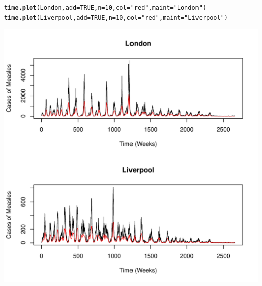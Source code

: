\documentclass[12pt]{article}\usepackage[]{graphicx}\usepackage[]{color}
\makeatletter
\def\maxwidth{ %
  \ifdim\Gin@nat@width>\linewidth
    \linewidth
  \else
    \Gin@nat@width
  \fi
}
\newcommand{\hlnum}[1]{\textcolor[rgb]{0.686,0.059,0.569}{#1}}%
\newcommand{\hlstr}[1]{\textcolor[rgb]{0.192,0.494,0.8}{#1}}%
\newcommand{\hlstd}[1]{\textcolor[rgb]{0.345,0.345,0.345}{#1}}%
\newcommand{\hlkwc}[1]{\textcolor[rgb]{0.333,0.667,0.333}{#1}}%
\newcommand{\hlkwd}[1]{\textcolor[rgb]{0.737,0.353,0.396}{\textbf{#1}}}%
\newenvironment{kframe}{%
 \def\at@end@of@kframe{}%
 \ifinner\ifhmode%
  \def\at@end@of@kframe{\end{minipage}}%
  \begin{minipage}{\columnwidth}%
 \fi\fi%
 \def\FrameCommand##1{\hskip\@totalleftmargin \hskip-\fboxsep
 \colorbox{shadecolor}{##1}\hskip-\fboxsep
     \hskip-\linewidth \hskip-\@totalleftmargin \hskip\columnwidth}%
 \MakeFramed {\advance\hsize-\width
   \@totalleftmargin\z@ \linewidth\hsize
   \@setminipage}}%
 {\par\unskip\endMakeFramed%
 \at@end@of@kframe}
\newenvironment{knitrout}{}{} %
\makeatother
\begin{document}
\begin{enumerate}[(a)]
\begin{enumerate}[(i)]
\begin{knitrout}
\begin{kframe}
\begin{alltt}
\hlkwd{time.plot}\hlstd{(London,} \hlkwc{add} \hlstd{=} \hlnum{TRUE}\hlstd{,} \hlkwc{n} \hlstd{=} \hlnum{10}\hlstd{,} \hlkwc{col} \hlstd{=} \hlstr{"red"}\hlstd{,} \hlkwc{maint} \hlstd{=} \hlstr{"London"}\hlstd{)}
\hlkwd{time.plot}\hlstd{(Liverpool,} \hlkwc{add}\hlstd{=}\hlnum{TRUE}\hlstd{,} \hlkwc{n}\hlstd{=}\hlnum{10}\hlstd{,} \hlkwc{col} \hlstd{=} \hlstr{"red"}\hlstd{,} \hlkwc{maint} \hlstd{=} \hlstr{"Liverpool"}\hlstd{)}
\end{alltt}
\end{kframe}
\includegraphics[width=\maxwidth]{figure/unnamed-chunk-2-1} 

\end{knitrout}



\end{enumerate}
\end{enumerate}
\end{document}
